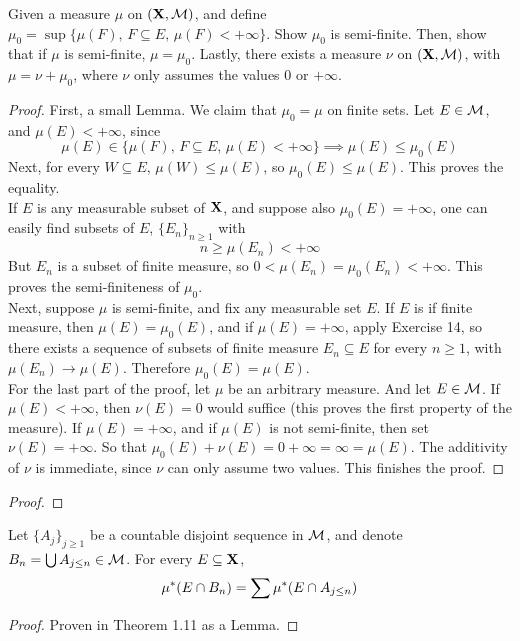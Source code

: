 \documentclass[../../main.tex]{subfiles}
\begin{document}
\begin{wts}
    Given a measure $\mu$ on $({\mathbf{X}},\mathcal{M})$, and define $\mu_0 = \sup\{\mu(F),\, F\subseteq E,\, \mu(F)<+\infty\}$. Show $\mu_0$ is semi-finite. Then, show that if $\mu$ is semi-finite, $\mu=\mu_0$. Lastly, there exists a measure $\nu$ on $({\mathbf{X}},\mathcal{M})$, with $\mu = \nu + \mu_0$, where $\nu$ only assumes the values $0$ or $+\infty$.
\end{wts}
\begin{proof}
First, a small Lemma. We claim that $\mu_0 = \mu$ on finite sets. Let $E\in\mathcal{M}$, and $\mu(E)<+\infty$, since \[\mu(E)\in\{\mu(F),\, F\subseteq E,\,\mu(E)<+\infty\}\implies \mu(E)\leq \mu_0(E)\]
Next, for every $W\subseteq E$, $\mu(W)\leq \mu(E)$, so $\mu_0(E)\leq \mu(E)$. This proves the equality.\\

If $E$ is any measurable subset of ${\mathbf{X}}$, and suppose also $\mu_0(E)=+\infty$,  one can easily find subsets of $E$, $\{E_n\}_{n\geq 1}$ with\[n\geq \mu(E_n)<+\infty\]
But $E_n$ is a subset of finite measure, so $0<\mu(E_n)=\mu_0(E_n)<+\infty$. This proves the semi-finiteness of $\mu_0$.\\

Next, suppose $\mu$ is semi-finite, and fix any measurable set $E$. If $E$ is if finite measure, then $\mu(E)=\mu_0(E)$, and if $\mu(E)=+\infty$, apply Exercise 14, so there exists a sequence of subsets of finite measure $E_n\subseteq E$ for every $n\geq 1$, with $\mu(E_n)\to \mu(E)$. Therefore $\mu_0(E)=\mu(E)$.\\

For the last part of the proof, let $\mu$ be an arbitrary measure. And let $E\in\mathcal{M}$. If $\mu(E)<+\infty$, then $\nu(E)=0$ would suffice (this proves the first property of the measure). If $\mu(E)=+\infty$, and if $\mu(E)$ is not semi-finite, then set $\nu(E)=+\infty$. So that $\mu_0(E)+\nu(E)=0 + \infty = \infty = \mu(E)$. The additivity of $\nu$ is immediate, since $\nu$ can only assume two values. This finishes the proof.
\end{proof}
\newpage

%

\begin{wts}
    
\end{wts}
\begin{proof}
    
\end{proof}
\newpage

\begin{wts}
    Let $\{A_j\}_{j\geq 1}$ be a countable disjoint sequence in $\mathcal{M}$, and denote $B_n = \bigcup A_{j\leq n}\in\mathcal{M}$. For every $E\subseteq {\mathbf{X}}$, 
    \[
        \mu^*(E\cap B_n) = \sum\mu^*(E\cap A_{j\leq n})
    \]
\end{wts}
\begin{proof}
    Proven in Theorem 1.11 as a Lemma.
\end{proof}
\newpage
\end{document}
